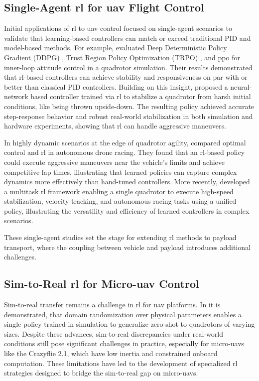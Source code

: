 \subsection{Single-Agent \gls{rl} for \gls{uav} Flight Control}

Initial applications of \gls{rl} to \gls{uav} control focused on single-agent scenarios to validate that learning-based controllers can match or exceed traditional PID and model-based methods. For example, \cite{Koch2018ReinforcementLF} evaluated Deep Deterministic Policy Gradient (DDPG) \cite{Lillicrap2015ContinuousCW}, Trust Region Policy Optimization (TRPO) \cite{Schulman2015TrustRP}, and \gls{ppo} \cite{schulman_proximal_2017} for inner-loop attitude control in a quadrotor simulation. Their results demonstrated that \gls{rl}-based controllers can achieve stability and responsiveness on par with or better than classical PID controllers. Building on this insight, \cite{Hwangbo2017ControlOA} proposed a neural-network based controller trained via \gls{rl} to stabilize a quadrotor from harsh initial conditions, like being thrown upside-down. The resulting policy achieved accurate step-response behavior and robust real-world stabilization in both simulation and hardware experiments, showing that \gls{rl} can handle aggressive maneuvers.

In highly dynamic scenarios at the edge of quadrotor agility, \cite{Song2023ReachingTL} compared optimal control and \gls{rl} in autonomous drone racing. They found that an \gls{rl}-based policy could execute aggressive maneuvers near the vehicle's limits and achieve competitive lap times, illustrating that learned policies can capture complex dynamics more effectively than hand-tuned controllers. More recently, \cite{xing_multi-task_2024} developed a multitask \gls{rl} framework enabling a single quadrotor to execute high-speed stabilization, velocity tracking, and autonomous racing tasks using a unified policy, illustrating the versatility and efficiency of learned controllers in complex scenarios. 

These single-agent studies set the stage for extending \gls{rl} methods to payload transport, where the coupling between vehicle and payload introduces additional challenges.

\subsection{Sim-to-Real \gls{rl} for Micro-\gls{uav} Control}
Sim-to-real transfer remains a challenge in \gls{rl} for \gls{uav} platforms. In \cite{molchanov_sim--multi-real_2019} it is demonstrated, that domain randomization over physical parameters enables a single policy trained in simulation to generalize zero-shot to quadrotors of varying sizes. Despite these advances, sim-to-real discrepancies under real-world conditions still pose significant challenges in practice, especially for micro-\glspl{uav} like the Crazyflie 2.1, which have low inertia and constrained onboard computation. These limitations have led to the development of specialized \gls{rl} strategies designed to bridge the sim-to-real gap on micro-\glspl{uav}.

